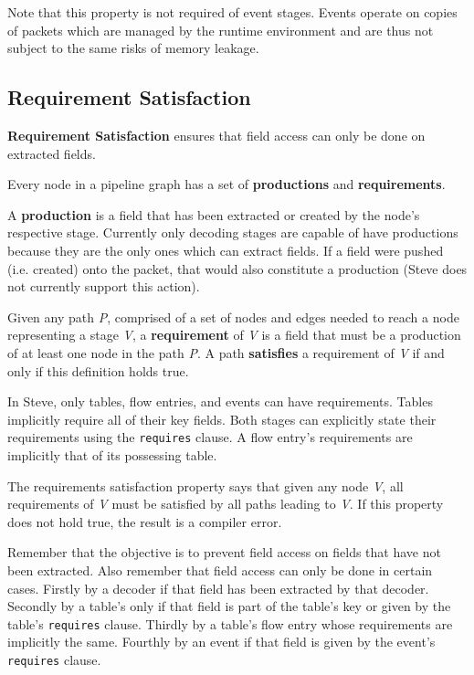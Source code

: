Note that this property is not required of event stages. Events operate on copies of packets which are managed by the runtime environment and are thus not subject to the same risks of memory leakage.

\subsection{Requirement Satisfaction} \label{requirements_guide}

\textbf{Requirement Satisfaction} ensures that field access can only be done on extracted fields. 

Every node in a pipeline graph has a set of \textbf{productions} and \textbf{requirements}.

A \textbf{production} is a field that has been extracted or created by the node's respective stage. Currently only decoding stages are capable of have productions because they are the only ones which can extract fields. If a field were pushed (i.e. created) onto the packet, that would also constitute a production (Steve does not currently support this action).

Given any path \textit{P}, comprised of a set of nodes and edges needed to reach a node representing a stage \textit{V}, a \textbf{requirement} of \textit{V} is a field that must be a production of at least one node in the path \textit{P}. A path \textbf{satisfies} a requirement of \textit{V} if and only if this definition holds true.

In Steve, only tables, flow entries, and events can have requirements. Tables implicitly require all of their key fields. Both stages can explicitly state their requirements using the \texttt{\color{blue}requires} clause. A flow entry's requirements are implicitly that of its possessing table.

The requirements satisfaction property says that given any node \textit{V}, all requirements of \textit{V} must be satisfied by all paths leading to \textit{V}. If this property does not hold true, the result is a compiler error.

Remember that the objective is to prevent field access on fields that have not been extracted. Also remember that field access can only be done in certain cases. Firstly by a decoder if that field has been extracted by that decoder. Secondly by a table's only if that field is part of the table's key or given by the table's \texttt{\color{blue}requires} clause. Thirdly by a table's flow entry whose requirements are implicitly the same. Fourthly by an event if that field is given by the event's \texttt{\color{blue}requires} clause.

